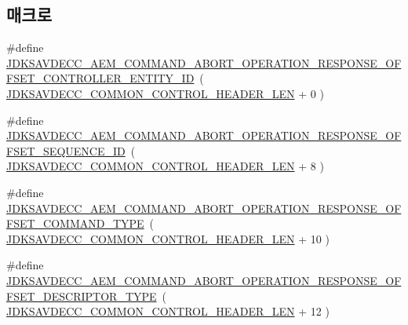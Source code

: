 \subsection*{매크로}
\begin{DoxyCompactItemize}
\item 
\#define \hyperlink{group__command__abort__operation__response_ga38858b7d1e5c984a6965723b3f6dd107}{J\+D\+K\+S\+A\+V\+D\+E\+C\+C\+\_\+\+A\+E\+M\+\_\+\+C\+O\+M\+M\+A\+N\+D\+\_\+\+A\+B\+O\+R\+T\+\_\+\+O\+P\+E\+R\+A\+T\+I\+O\+N\+\_\+\+R\+E\+S\+P\+O\+N\+S\+E\+\_\+\+O\+F\+F\+S\+E\+T\+\_\+\+C\+O\+N\+T\+R\+O\+L\+L\+E\+R\+\_\+\+E\+N\+T\+I\+T\+Y\+\_\+\+ID}~( \hyperlink{group__jdksavdecc__avtp__common__control__header_gaae84052886fb1bb42f3bc5f85b741dff}{J\+D\+K\+S\+A\+V\+D\+E\+C\+C\+\_\+\+C\+O\+M\+M\+O\+N\+\_\+\+C\+O\+N\+T\+R\+O\+L\+\_\+\+H\+E\+A\+D\+E\+R\+\_\+\+L\+EN} + 0 )
\item 
\#define \hyperlink{group__command__abort__operation__response_ga54e84d578e7a875b7363174a25d56dc8}{J\+D\+K\+S\+A\+V\+D\+E\+C\+C\+\_\+\+A\+E\+M\+\_\+\+C\+O\+M\+M\+A\+N\+D\+\_\+\+A\+B\+O\+R\+T\+\_\+\+O\+P\+E\+R\+A\+T\+I\+O\+N\+\_\+\+R\+E\+S\+P\+O\+N\+S\+E\+\_\+\+O\+F\+F\+S\+E\+T\+\_\+\+S\+E\+Q\+U\+E\+N\+C\+E\+\_\+\+ID}~( \hyperlink{group__jdksavdecc__avtp__common__control__header_gaae84052886fb1bb42f3bc5f85b741dff}{J\+D\+K\+S\+A\+V\+D\+E\+C\+C\+\_\+\+C\+O\+M\+M\+O\+N\+\_\+\+C\+O\+N\+T\+R\+O\+L\+\_\+\+H\+E\+A\+D\+E\+R\+\_\+\+L\+EN} + 8 )
\item 
\#define \hyperlink{group__command__abort__operation__response_ga2878ba3df5a1005ae938dee1a7bb5658}{J\+D\+K\+S\+A\+V\+D\+E\+C\+C\+\_\+\+A\+E\+M\+\_\+\+C\+O\+M\+M\+A\+N\+D\+\_\+\+A\+B\+O\+R\+T\+\_\+\+O\+P\+E\+R\+A\+T\+I\+O\+N\+\_\+\+R\+E\+S\+P\+O\+N\+S\+E\+\_\+\+O\+F\+F\+S\+E\+T\+\_\+\+C\+O\+M\+M\+A\+N\+D\+\_\+\+T\+Y\+PE}~( \hyperlink{group__jdksavdecc__avtp__common__control__header_gaae84052886fb1bb42f3bc5f85b741dff}{J\+D\+K\+S\+A\+V\+D\+E\+C\+C\+\_\+\+C\+O\+M\+M\+O\+N\+\_\+\+C\+O\+N\+T\+R\+O\+L\+\_\+\+H\+E\+A\+D\+E\+R\+\_\+\+L\+EN} + 10 )
\item 
\#define \hyperlink{group__command__abort__operation__response_ga0bdad4aae091fcbfcebd5ec8cef08930}{J\+D\+K\+S\+A\+V\+D\+E\+C\+C\+\_\+\+A\+E\+M\+\_\+\+C\+O\+M\+M\+A\+N\+D\+\_\+\+A\+B\+O\+R\+T\+\_\+\+O\+P\+E\+R\+A\+T\+I\+O\+N\+\_\+\+R\+E\+S\+P\+O\+N\+S\+E\+\_\+\+O\+F\+F\+S\+E\+T\+\_\+\+D\+E\+S\+C\+R\+I\+P\+T\+O\+R\+\_\+\+T\+Y\+PE}~( \hyperlink{group__jdksavdecc__avtp__common__control__header_gaae84052886fb1bb42f3bc5f85b741dff}{J\+D\+K\+S\+A\+V\+D\+E\+C\+C\+\_\+\+C\+O\+M\+M\+O\+N\+\_\+\+C\+O\+N\+T\+R\+O\+L\+\_\+\+H\+E\+A\+D\+E\+R\+\_\+\+L\+EN} + 12 )

\end{DoxyCompactItemize}
